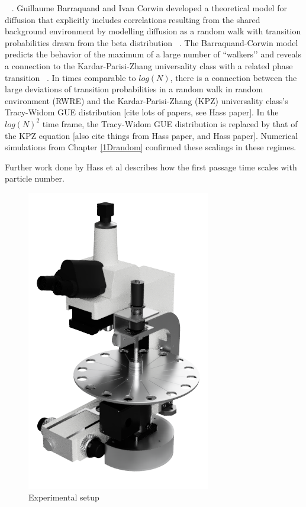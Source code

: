 ~ \cite{grebenkov_exact_2020}. Guillaume Barraquand and Ivan Corwin developed a theoretical model for diffusion that explicitly includes correlations resulting from the shared background environment by modelling diffusion as a random walk with transition probabilities drawn from the beta distribution~ \cite{barraquand_random-walk_2017}. The Barraquand-Corwin model predicts the behavior of the maximum of a large number of ``walkers’’ and reveals a connection to the Kardar-Parisi-Zhang universality class with a related phase transition~ \cite{barraquand_random-walk_2017, barraquand_moderate_2020, le_doussal_diffusion_2017, kardar_dynamic_1986}. In times comparable to $log\left(N\right)$, there is a connection between the large deviations of transition probabilities in a random walk in random environment (RWRE) and the Kardar-Parisi-Zhang (KPZ) universality class's Tracy-Widom GUE distribution [cite lots of papers, see Hass paper]. In  the $log\left(N\right)^{2}$ time frame, the Tracy-Widom GUE distribution is replaced by that of the KPZ equation [also cite things from Hass paper, and Hass paper]. Numerical simulations from Chapter \ref{1Drandom} confirmed these scalings in these regimes.

Further work done by Hass et al describes how the first passage time scales with particle number.

%

\begin{figure}[htp]
\begin{center}
\includegraphics[width=0.35\columnwidth]{Figures/microscope_centrifuge.png}
\caption{\label{fig:CADrender} Experimental setup}
\end{center}
\end{figure}

